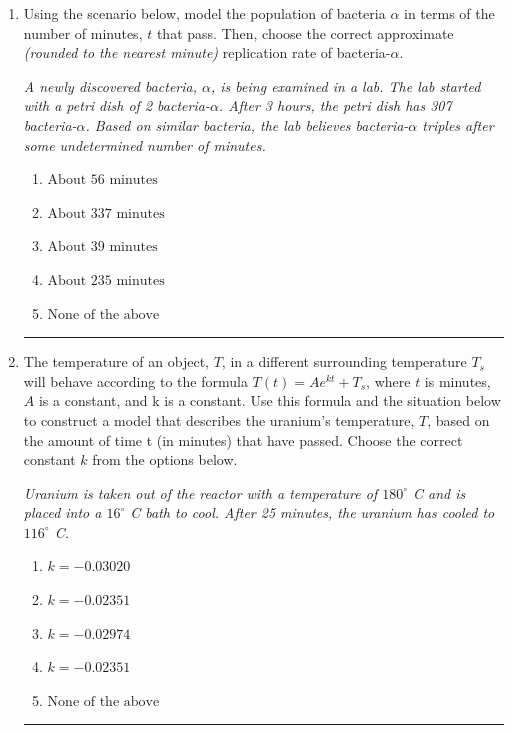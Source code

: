 \documentclass[14pt]{extbook}
\newcommand{\litem}[1]{\item#1\hspace*{-1cm}\rule{\textwidth}{0.4pt}}
\begin{document}
\begin{enumerate}
{\begin{enumerate}[label=\Alph*.]
\end{enumerate} }
\litem{
Using the scenario below, model the population of bacteria $\alpha$ in terms of the number of minutes, $t$ that pass. Then, choose the correct approximate \textit{(rounded to the nearest minute)} replication rate of bacteria-$\alpha$.
\begin{center}
    \textit{ A newly discovered bacteria, $\alpha$, is being examined in a lab. The lab started with a petri dish of 2 bacteria-$\alpha$. After 3 hours, the petri dish has 307 bacteria-$\alpha$. Based on similar bacteria, the lab believes bacteria-$\alpha$ triples after some undetermined number of minutes. }
\end{center}
\begin{enumerate}[label=\Alph*.]
\item \( \text{About } 56 \text{ minutes} \)
\item \( \text{About } 337 \text{ minutes} \)
\item \( \text{About } 39 \text{ minutes} \)
\item \( \text{About } 235 \text{ minutes} \)
\item \( \text{None of the above} \)

\end{enumerate} }
\litem{
The temperature of an object, $T$, in a different surrounding temperature $T_s$ will behave according to the formula $T(t) = Ae^{kt} + T_s$, where $t$ is minutes, $A$ is a constant, and k is a constant. Use this formula and the situation below to construct a model that describes the uranium's temperature, $T$, based on the amount of time t (in minutes) that have passed. Choose the correct constant $k$ from the options below.
\begin{center}
    \textit{ Uranium is taken out of the reactor with a temperature of $180^{\circ}$ C and is placed into a $16^{\circ}$ C bath to cool. After 25 minutes, the uranium has cooled to $116^{\circ}$ C. }
\end{center}
\begin{enumerate}[label=\Alph*.]
\item \( k = -0.03020 \)
\item \( k = -0.02351 \)
\item \( k = -0.02974 \)
\item \( k = -0.02351 \)
\item \( \text{None of the above} \)

\end{enumerate} }
\end{enumerate}
\end{document}
